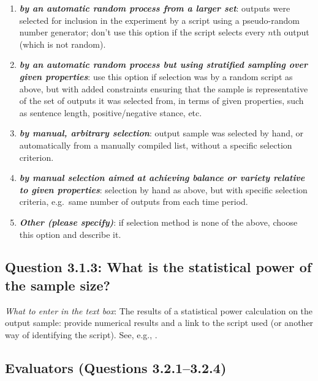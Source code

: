 \documentclass[11pt,a4paper]{article}
\newcommand{\egcvalue}[1]{\textbf{\textit{#1}}}
\begin{document}
\begin{enumerate}[itemsep=0cm,leftmargin=0.5cm,label={\LARGE $\circ$}]
    \item \egcvalue{by an automatic random process from a larger set}: outputs were selected for inclusion in the experiment by a script using a pseudo-random number generator; don't use this option if the script selects every $n$th output (which is not random). 
    \item \egcvalue{by an automatic random process but using stratified sampling over given properties}: use this option if selection was by a random script as above, but with added constraints ensuring that the sample is representative of the set of outputs it was selected from, in terms of given properties, such as sentence length, positive/negative stance, etc.
    \item \egcvalue{by manual, arbitrary selection}: output sample was selected by hand, or automatically from a manually compiled list, without a specific selection criterion.
    \item \egcvalue{by manual selection aimed at achieving balance or variety relative to given properties}: selection by hand as above, but with specific selection criteria, e.g.\ same number of outputs from each time period.
    \item \egcvalue{Other (please specify)}: if selection method is none of the above, choose this option and describe it.
\end{enumerate}

\vspace{-.3cm}
\subsection*{Question 3.1.3: What is the statistical power of the sample size?}

\noindent\textit{What to enter in the text box}:  The results of a statistical power calculation on the output sample: provide numerical results and a link to the script used (or another way of identifying the script). See, e.g., \citet{card-etal-2020-little}.



\subsection{Evaluators (Questions 3.2.1--3.2.4)}
\end{document}

